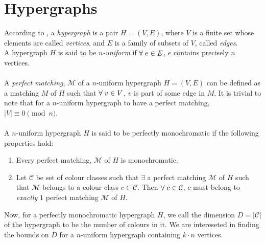 \documentclass[11pt]{article}
\begin{document}
\section*{Hypergraphs}
According to \cite{10.5555/3002498}, a \textit{hypergraph} is a pair $H=(V,E)$, where $V$ is a finite set whose elements are called \textit{vertices}, and $E$ is a family of subsets of $V$, called \textit{edges}. \\
A hypergraph $H$ is said to be \textit{$n$-uniform} if $\forall \hspace{0.1cm} e \in E$, $e$ contains precisely $n$ vertices. \\\\
A \textit{perfect matching}, $\mathcal{M}$ of a $n$-uniform hypergraph $H=(V,E)$ can be defined as a matching $M$ of $H$ such that $\forall \hspace{0.1cm} v \in V$, $v$ is part of some edge in $M$. It is trivial to note that for a $n$-uniform hypergraph to have a perfect matching, $|V| \equiv 0 \pmod n$. \\ \\
A $n$-uniform hypergraph $H$ is said to be perfectly monochromatic if the following \\properties hold:
\begin{enumerate}
    \item Every perfect matching, $\mathcal{M}$ of $H$ is monochromatic.
    \item Let $\mathcal{C}$ be set of colour classes such that $\exists$ a perfect matching $\mathcal{M}$ of $H$ such that $\mathcal{M}$ belongs to a colour class $c \in \mathcal{C}$. Then $\forall \hspace{0.1cm} c \in \mathcal{C}$, $c$ must belong to \textit{exactly} $1$ perfect matching $\mathcal{M}$ of $H$.
\end{enumerate}
Now, for a perfectly monochromatic hypergraph $H$, we call the dimension $D=|\mathcal{C}|$ of the hypergraph to be the number of colours in it. We are intereseted in finding the bounds on $D$ for a $n$-uniform hypergraph containing $k\cdot n$ vertices.
\end{document}
